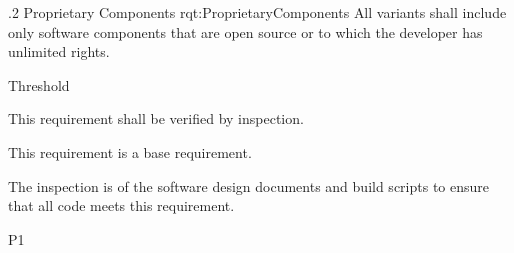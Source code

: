 
\ONERQMTV
{\RqtNumberBase.2}
{Proprietary Components}
{rqt:ProprietaryComponents}
{
All \ThisSystem variants shall include only software components that are open source or to which the developer has unlimited rights.
}
{
	\item [All Phases] Threshold
}
{This requirement shall be verified by inspection.}
{
	\item [N/A] This requirement is a base requirement.
}
{
	\item The inspection is of the software design documents and build scripts to ensure that all code meets this requirement.
}
{P1}
